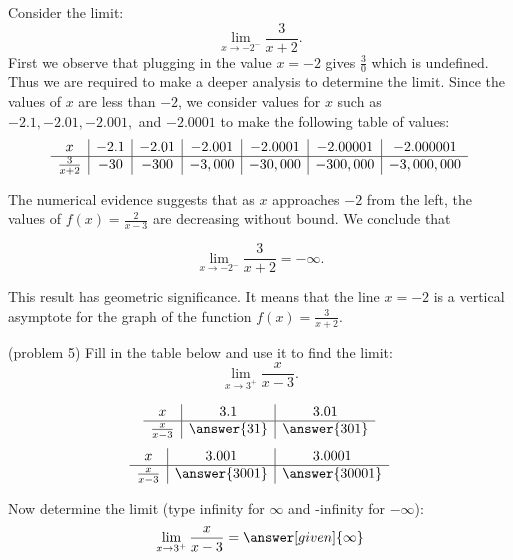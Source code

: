 \documentclass{ximera}
\begin{document}
\begin{example}[example 5]
Consider the limit:
\[\lim_{x \to -2^-} \frac{3}{x+2}. \]
First we observe that plugging in the value $x=-2$ gives $\frac{3}{0}$ which is undefined. 
Thus we are required to make a deeper analysis to determine the limit.
Since the values of $x$ are less than $-2$, we consider values for $x$ such as 
$-2.1, -2.01, -2.001,$ and $-2.0001$ to make the following table of values:\\

\[
\begin{array}{ c | c | c | c | c| c| c}
  x & -2.1 & -2.01 & -2.001 & -2.0001 & -2.00001 & -2.000001\\ 
	\hline  
	 \frac{3}{x+2} & -30 & -300 & -3,000 & -30,000 & -300,000 & -3,000,000
\end{array}
\] 

The numerical evidence suggests that as $x$ approaches $-2$ from the left, 
the values of $f(x) = \frac{2}{x-3}$ are decreasing without bound. We conclude that 

\[\lim_{x \to -2^-} \frac{3}{x+2} =  -\infty. \]

This result has geometric significance.  
It means that the line $x=-2$ is a vertical asymptote for the graph of the function $f(x) = \frac{3}{x+2}.$
\end{example}



\begin{problem}(problem 5)
Fill in the table below and use it to find the limit:
\[\lim_{x \to 3^+} \frac{x}{x-3}.\]

\begin{prompt}
\begin{center}
\[
\begin{array}{ c | c | c }
  x & 3.1 & 3.01   \\ 
	\hline 
	 \frac{x}{x-3} & \answer{31} & \answer{301} 
\end{array}
\]
\[
\begin{array}{ c | c | c  }
  x  & 3.001 & 3.0001 \\ 
	\hline 
	 \frac{x}{x-3}  & \answer{3001} & \answer{30001}
\end{array}
\]
\end{center}
Now determine the limit (type infinity for $\infty$ and -infinity for $-\infty$):
\[
\lim_{x \to 3^+} \frac{x}{x-3} = \answer[given]{\infty}
\]
\end{prompt}
\end{problem}
\end{document}

